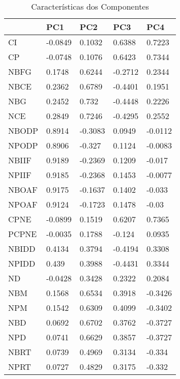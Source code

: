 \begin{table}[H]
\centering
\begin{tabular}{@{}lllll@{}}
\toprule
\textbf{} & \textbf{PC1} & \textbf{PC2} & \textbf{PC3} & \textbf{PC4} \\ \midrule
CI        & -0.0849      & 0.1032       & 0.6388       & 0.7223       \\
CP        & -0.0748      & 0.1076       & 0.6423       & 0.7344       \\
NBFG      & 0.1748       & 0.6244       & -0.2712      & 0.2344       \\
NBCE      & 0.2362       & 0.6789       & -0.4401      & 0.1951       \\
NBG       & 0.2452       & 0.732        & -0.4448      & 0.2226       \\
NCE       & 0.2849       & 0.7246       & -0.4295      & 0.2552       \\
NBODP     & 0.8914       & -0.3083      & 0.0949       & -0.0112      \\
NPODP     & 0.8906       & -0.327       & 0.1124       & -0.0083      \\
NBIIF     & 0.9189       & -0.2369      & 0.1209       & -0.017       \\
NPIIF     & 0.9185       & -0.2368      & 0.1453       & -0.0077      \\
NBOAF     & 0.9175       & -0.1637      & 0.1402       & -0.033       \\
NPOAF     & 0.9124       & -0.1723      & 0.1478       & -0.03        \\
CPNE      & -0.0899      & 0.1519       & 0.6207       & 0.7365       \\
PCPNE     & -0.0035      & 0.1788       & -0.124       & 0.0935       \\
NBIDD     & 0.4134       & 0.3794       & -0.4194      & 0.3308       \\
NPIDD     & 0.439        & 0.3988       & -0.4431      & 0.3344       \\
ND        & -0.0428      & 0.3428       & 0.2322       & 0.2084       \\
NBM       & 0.1568       & 0.6534       & 0.3918       & -0.3426      \\
NPM       & 0.1542       & 0.6309       & 0.4099       & -0.3402      \\
NBD       & 0.0692       & 0.6702       & 0.3762       & -0.3727      \\
NPD       & 0.0741       & 0.6629       & 0.3857       & -0.3727      \\
NBRT      & 0.0739       & 0.4969       & 0.3134       & -0.334       \\
NPRT      & 0.0727       & 0.4829       & 0.3175       & -0.332       \\ \bottomrule
\end{tabular}
\caption{Características dos Componentes}
\label{tbl:caracteristicas-dos-componentes}
\end{table}